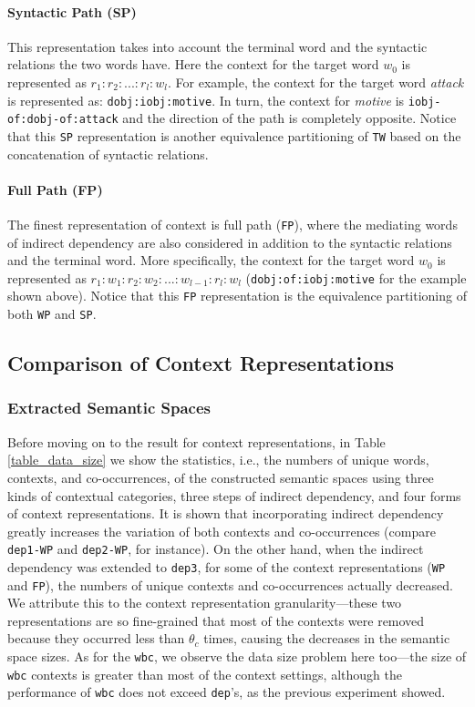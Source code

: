 \documentclass[english]{jnlp_1.4}
\begin{document}
\paragraph{Syntactic Path (SP)} \quad

This representation takes into account the terminal word and the
syntactic relations the two words have. Here the context for the
target word $w_0$ is represented as $r_1:r_2:...:r_l:w_l$. For
example, the context for the target word {\em attack} is represented
as: \verb|dobj:iobj:motive|. In turn, the context for {\em motive} is
\verb|iobj-of:dobj-of:attack| and the direction of the path is
completely opposite. Notice that this \verb|SP| representation is
another equivalence partitioning of \verb|TW| based on the
concatenation of syntactic relations.

\paragraph{Full Path (FP)} \quad

The finest representation of context is full path (\verb|FP|), where
the mediating words of indirect dependency are also considered in
addition to the syntactic relations and the terminal word. More
specifically, the context for the target word $w_0$ is represented as
$r_1:w_1:r_2:w_2:...:w_{l-1}:r_l:w_l$ (\verb|dobj:of:iobj:motive| for
the example shown above). Notice that this \verb|FP| representation is
the equivalence partitioning of both \verb|WP| and \verb|SP|.

\subsection{Comparison of Context Representations}


\subsubsection{Extracted Semantic Spaces}

Before moving on to the result for context representations, 
\pagebreak
in Table \ref{table_data_size} we show the statistics, i.e., the numbers of
unique words, contexts, and co-occurrences, of the constructed
semantic spaces using three kinds of contextual categories, three
steps of indirect dependency, and four forms of context
representations. It is shown that incorporating indirect dependency
greatly increases the variation of both contexts and co-occurrences
(compare \verb|dep1-WP| and \verb|dep2-WP|, for instance). On the
other hand, when the indirect dependency was extended to \verb|dep3|,
for some of the context representations (\verb|WP| and \verb|FP|), the
numbers of unique contexts and co-occurrences actually decreased. We
attribute this to the context representation granularity---these two
representations are so fine-grained that most of the contexts were
removed because they occurred less than $\theta_c$ times, causing the
decreases in the semantic space sizes. As for the \verb|wbc|, we
observe the data size problem here too---the size of \verb|wbc|
contexts is greater than most of the context settings, although the
performance of \verb|wbc| does not exceed \verb|dep|'s, as the
previous experiment showed.
\end{document}
